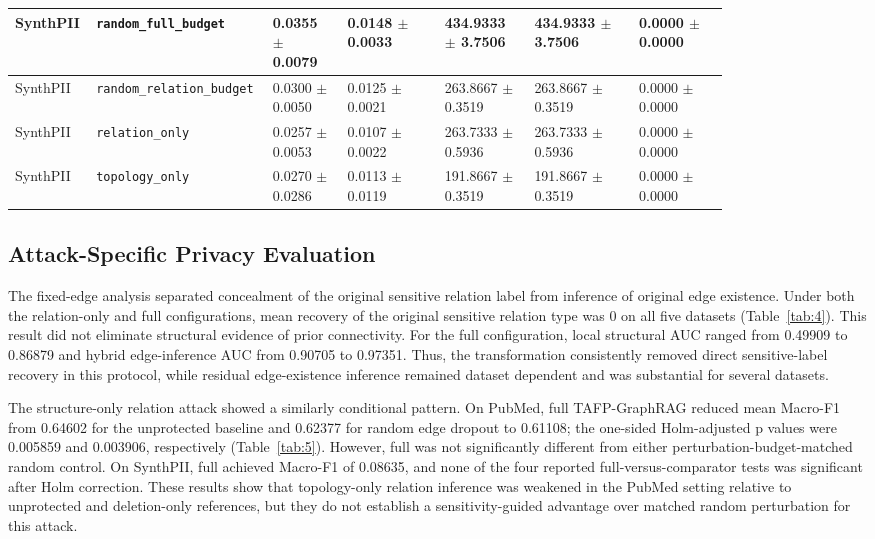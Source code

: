 \documentclass[preprint,12pt]{elsarticle}
\begin{document}
\begin{landscape}
\begin{longtable}{|L{0.07\linewidth}|L{0.15\linewidth}|C{0.10\linewidth}|C{0.13\linewidth}|C{0.12\linewidth}|C{0.14\linewidth}|C{0.12\linewidth}|}
SynthPII & \nolinkurl{random_full_budget} & 0.0355 $\pm$ 0.0079 & 0.0148 $\pm$ 0.0033 & 434.9333 $\pm$ 3.7506 & 434.9333 $\pm$ 3.7506 & 0.0000 $\pm$ 0.0000 \\ \hline
SynthPII & \nolinkurl{random_relation_budget} & 0.0300 $\pm$ 0.0050 & 0.0125 $\pm$ 0.0021 & 263.8667 $\pm$ 0.3519 & 263.8667 $\pm$ 0.3519 & 0.0000 $\pm$ 0.0000 \\ \hline
SynthPII & \nolinkurl{relation_only} & 0.0257 $\pm$ 0.0053 & 0.0107 $\pm$ 0.0022 & 263.7333 $\pm$ 0.5936 & 263.7333 $\pm$ 0.5936 & 0.0000 $\pm$ 0.0000 \\ \hline
SynthPII & \nolinkurl{topology_only} & 0.0270 $\pm$ 0.0286 & 0.0113 $\pm$ 0.0119 & 191.8667 $\pm$ 0.3519 & 191.8667 $\pm$ 0.3519 & 0.0000 $\pm$ 0.0000 \\ \hline
\end{longtable}
\endgroup
\end{landscape}
\subsection{Attack-Specific Privacy Evaluation}
The fixed-edge analysis separated concealment of the original sensitive relation label from inference of original edge existence. Under both the relation-only and full configurations, mean recovery of the original sensitive relation type was 0 on all five datasets (Table~\ref{tab:4}). This result did not eliminate structural evidence of prior connectivity. For the full configuration, local structural AUC ranged from 0.49909 to 0.86879 and hybrid edge-inference AUC from 0.90705 to 0.97351. Thus, the transformation consistently removed direct sensitive-label recovery in this protocol, while residual edge-existence inference remained dataset dependent and was substantial for several datasets.

The structure-only relation attack showed a similarly conditional pattern. On PubMed, full TAFP-GraphRAG reduced mean Macro-F1 from 0.64602 for the unprotected baseline and 0.62377 for random edge dropout to 0.61108; the one-sided Holm-adjusted p values were 0.005859 and 0.003906, respectively (Table~\ref{tab:5}). However, full was not significantly different from either perturbation-budget-matched random control. On SynthPII, full achieved Macro-F1 of 0.08635, and none of the four reported full-versus-comparator tests was significant after Holm correction. These results show that topology-only relation inference was weakened in the PubMed setting relative to unprotected and deletion-only references, but they do not establish a sensitivity-guided advantage over matched random perturbation for this attack.
\end{document}
